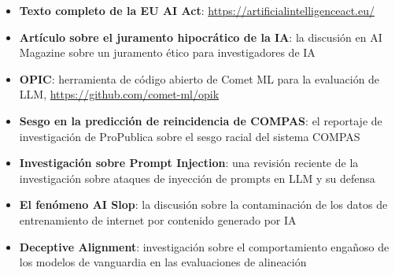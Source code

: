 \documentclass[a4paper]{article}
\begin{document}
\begin{itemize}
    \item \textbf{Texto completo de la EU AI Act}: \url{https://artificialintelligenceact.eu/}
    \item \textbf{Artículo sobre el juramento hipocrático de la IA}: la discusión en AI Magazine sobre un juramento ético para investigadores de IA
    \item \textbf{OPIC}: herramienta de código abierto de Comet ML para la evaluación de LLM, \url{https://github.com/comet-ml/opik}
    \item \textbf{Sesgo en la predicción de reincidencia de COMPAS}: el reportaje de investigación de ProPublica sobre el sesgo racial del sistema COMPAS
    \item \textbf{Investigación sobre Prompt Injection}: una revisión reciente de la investigación sobre ataques de inyección de prompts en LLM y su defensa
    \item \textbf{El fenómeno AI Slop}: la discusión sobre la contaminación de los datos de entrenamiento de internet por contenido generado por IA
    \item \textbf{Deceptive Alignment}: investigación sobre el comportamiento engañoso de los modelos de vanguardia en las evaluaciones de alineación
\end{itemize}

\end{document}
